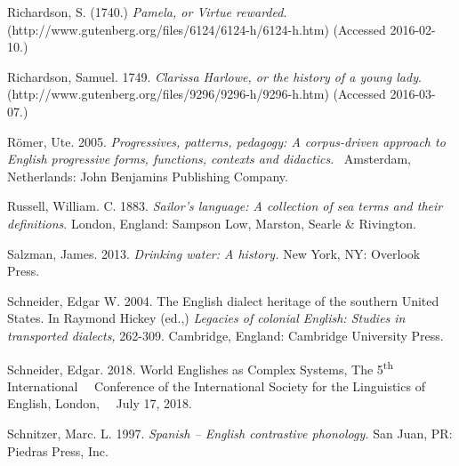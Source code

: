 \begin{styleStandard}
Richardson, S. (1740.) \textit{Pamela, or Virtue rewarded}. (http://www.gutenberg.org/files/6124/6124-h/6124-h.htm) (Accessed 2016-02-10.)
\end{styleStandard}


\begin{styleStandard}
Richardson, Samuel. 1749. \textit{Clarissa Harlowe, or the history of a young lady}. (http://www.gutenberg.org/files/9296/9296-h/9296-h.htm) (Accessed 2016-03-07.)
\end{styleStandard}


\begin{styleStandard}
Römer, Ute. 2005. \textit{Progressives, patterns, pedagogy: A corpus-driven approach to English progressive forms, functions, contexts and didactics}. \ Amsterdam, Netherlands: John Benjamins Publishing Company.
\end{styleStandard}


\begin{styleStandard}
Russell, William. C. 1883. \textit{Sailor’s language: A collection of sea terms and their definitions}. London, England: Sampson Low, Marston, Searle \& Rivington.
\end{styleStandard}


\begin{styleStandard}
Salzman, James. 2013. \textit{Drinking water: A history.} New York, NY: Overlook Press. 
\end{styleStandard}


\begin{styleStandard}
Schneider, Edgar W. 2004. The English dialect heritage of the southern United States. In Raymond Hickey (ed.,) \textit{Legacies of colonial English: Studies in transported dialects, }262-309. Cambridge, England: Cambridge University Press.
\end{styleStandard}


\begin{styleStandard}
Schneider, Edgar. 2018. World Englishes as Complex Systems, The 5\textsuperscript{th} International \ \ Conference of the International Society for the Linguistics of English, London, \ \ July 17, 2018. 
\end{styleStandard}


\begin{styleStandard}
Schnitzer, Marc. L. 1997. \textit{Spanish – English contrastive phonology. }San Juan, PR: Piedras Press, Inc.
\end{styleStandard}



